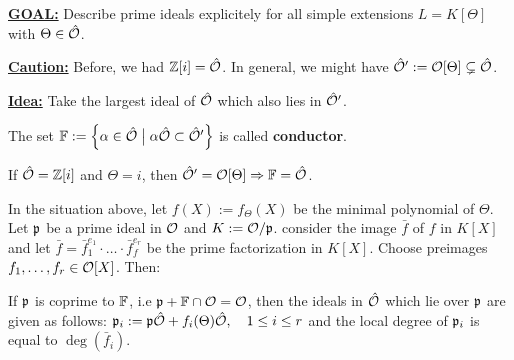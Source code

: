 \bigskip

\textbf{\underline{GOAL:}} Describe prime ideals explicitely for all simple extensions $L = K[\Theta]$ with $\Theta \in \hat{\mathcal{O}}$.

\textbf{\underline{Caution:}} Before, we had $\mathbb{Z}[i] = \hat{\mathcal{O}}$. In general, we might have $\hat{\mathcal{O}}' := \mathcal{O}[\Theta] \subsetneq \hat{\mathcal{O}}$.

\textbf{\underline{Idea:}} Take the largest ideal of $\hat{\mathcal{O}}$ which also lies in $\hat{\mathcal{O}}'$.

\begin{defi}
	The set $\mathbb{F} := \left\{ {\alpha \in \hat{\mathcal{O}}} \bigm| {\alpha\hat{\mathcal{O}} \subset \hat{\mathcal{O}}'} \right\}$ is called \textbf{conductor}.
\end{defi}

\begin{Bsp}
	If $\hat{\mathcal{O}} = \mathbb{Z}[i]$ and $\Theta = i$, then $\hat{\mathcal{O}}' = \mathcal{O}[\Theta] \Rightarrow \mathbb{F} = \hat{\mathcal{O}}$.
\end{Bsp}

\begin{Prop}
	In the situation above, let $f(X) := f_\Theta(X)$ be the minimal polynomial of $\Theta$. Let $\mathfrak{p}$ be a prime ideal in $\mathcal{O}$ and $K := \mathcal{O} / \mathfrak{p}$. consider the image $\bar f$ of $f$ in $K[X]$ and let $\bar f = \bar f_1^{e_1} \cdot \dots \cdot \bar f_f^{e_r}$ be the prime factorization in $K[X]$. Choose preimages $f_1, \dots, f_r \in \mathcal{O}[X]$. Then:
	
	If $\mathfrak{p}$ is coprime to $\mathbb{F}$, i.e $\mathfrak{p} + \mathbb{F} \cap \mathcal{O} = \mathcal{O}$, then the ideals in $\hat{\mathcal{O}}$ which lie over $\mathfrak{p}$ are given as follows: $\mathfrak{p}_i := \mathfrak{p}\hat{\mathcal{O}} + f_i(\Theta) \hat{\mathcal{O}}, \quad 1 \leq i \leq r$ and the local degree of $\mathfrak{p}_i$ is equal to $\deg(\bar f_i)$.
\end{Prop}